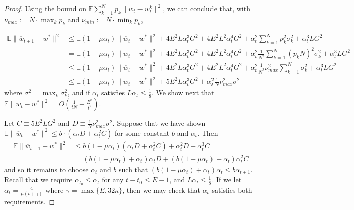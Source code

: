\begin{proof}
		Using the bound on $\mathbb{E}\sum_{k=1}^{N}p_{k}\|\overline{w}_{t}-w_{t}^{k}\|^{2}$,
		we can conclude that, with $\nu_{max}:=N\cdot\max_{k}p_{k}$ and $\nu_{min}:=N\cdot\min_{k}p_{k}$, 
		
		\begin{align*}
		\mathbb{E}\|\overline{w}_{t+1}-w^{\ast}\|^{2} & \leq\mathbb{E}(1-\mu\alpha_{t})\|\overline{w}_{t}-w^{\ast}\|^{2}+4E^{2}L\alpha_{t}^{3}G^{2}+4E^{2}L^{2}\alpha_{t}^{4}G^{2}+\alpha_{t}^{2}\sum_{k=1}^{N}p_{k}^{2}\sigma_{k}^{2}+\alpha_{t}^{3}LG^{2}\\
		& =\mathbb{E}(1-\mu\alpha_{t})\|\overline{w}_{t}-w^{\ast}\|^{2}+4E^{2}L\alpha_{t}^{3}G^{2}+4E^{2}L^{2}\alpha_{t}^{4}G^{2}+\alpha_{t}^{2}\frac{1}{N^{2}}\sum_{k=1}^{N}(p_{k}N)^{2}\sigma_{k}^{2}+\alpha_{t}^{3}LG^{2}\\
		& \leq\mathbb{E}(1-\mu\alpha_{t})\|\overline{w}_{t}-w^{\ast}\|^{2}+4E^{2}L\alpha_{t}^{3}G^{2}+4E^{2}L^{2}\alpha_{t}^{4}G^{2}+\alpha_{t}^{2}\frac{1}{N^{2}}\nu_{max}^{2}\sum_{k=1}^{N}\sigma_{k}^{2}+\alpha_{t}^{3}LG^{2}\\
		& \leq\mathbb{E}(1-\mu\alpha_{t})\|\overline{w}_{t}-w^{\ast}\|^{2}+5E^{2}L\alpha_{t}^{3}G^{2}+\alpha_{t}^{2}\frac{1}{N}\nu_{max}^{2}\sigma^{2}
		\end{align*}
		where $\sigma^{2}=\max_{k}\sigma_{k}^{2}$, and if $\alpha_{t}$
		satisfies $L\alpha_{t}\leq\frac{1}{8}$. We show next that $\mathbb{E}\|\overline{w}_{t}-w^{\ast}\|^{2}=O(\frac{1}{tN}+\frac{E^{2}}{t^{2}})$. 
		
		Let $C\equiv5E^{2}LG^{2}$ and $D\equiv\frac{1}{N}\nu_{max}^{2}\sigma^{2}$.
		Suppose that we have shown $\mathbb{E}\|\overline{w}_{t}-w^{\ast}\|^{2}\leq b\cdot(\alpha_{t}D+\alpha_{t}^{2}C)$
		for some constant $b$ and $\alpha_{t}$. Then 
		\begin{align*}
		\mathbb{E}\|\overline{w}_{t+1}-w^{\ast}\|^{2} & \leq b(1-\mu\alpha_{t})(\alpha_{t}D+\alpha_{t}^{2}C)+\alpha_{t}^{2}D+\alpha_{t}^{3}C\\
		& =(b(1-\mu\alpha_{t})+\alpha_{t})\alpha_{t}D+(b(1-\mu\alpha_{t})+\alpha_{t})\alpha_{t}^{2}C
		\end{align*}
		and so it remains to choose $\alpha_{t}$ and $b$ such that $(b(1-\mu\alpha_{t})+\alpha_{t})\alpha_{t}\leq b\alpha_{t+1}$.
		Recall that we require $\alpha_{t_{0}}\leq\alpha_{t}$ for any $t-t_{0}\leq E-1$,
		and $L\alpha_{t}\leq\frac{1}{8}$. If we let $\alpha_{t}=\frac{4}{\mu(t+\gamma)}$
		where $\gamma=\max\{E,32\kappa\}$, then we may check that $\alpha_{t}$
		satisfies both requirements. 
		

\end{proof}
